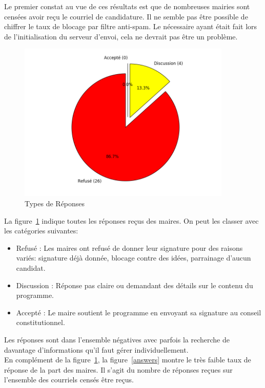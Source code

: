 \documentclass{article}
\begin{document}
Le premier constat au vue de ces résultats est que de nombreuses mairies sont censées avoir reçu le courriel de candidature. Il ne semble pas être possible de chiffrer le taux de blocage par filtre anti-spam. Le nécessaire ayant était fait lors de l'initialisation du serveur d'envoi, cela ne devrait pas être un problème.\\

\begin{figure}[h]
    \centering
    \includegraphics[width=4in]{result.png}
    \caption{Types de Réponses}
    \label{result}
\end{figure}

La figure~\ref{result} indique toutes les réponses reçus des maires. On peut les classer avec les catégories suivantes:
\begin{itemize}
\item Refusé : Les maires ont refusé de donner leur signature pour des raisons variés: signature déjà donnée, blocage contre des idées, parrainage d'aucun candidat.
\item Discussion : Réponse pas claire ou demandant des détails sur le contenu du programme.
\item Accepté : Le maire soutient le programme en envoyant sa signature au conseil constitutionnel.
\end{itemize}

Les réponses sont dans l'ensemble négatives avec parfois la recherche de davantage d'informations qu'il faut gérer individuellement.\\

En complément de la figure~\ref{result}, la figure~\ref{answers} montre le très faible taux de réponse de la part des maires. Il s'agit du nombre de réponses reçues sur l'ensemble des courriels censés être reçus.
\end{document}
